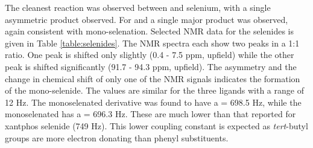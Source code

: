 {%



The cleanest reaction was observed between \tBuxantphos{} and selenium, with a single asymmetric product observed.  For \tButhixantphos{} and \tBusixantphos{} a single major product was observed, again consistent with mono-selenation. Selected NMR data for the selenides is given in Table \ref{table:selenides}.  The \phosphorus{} NMR spectra each show two peaks in a 1:1 ratio.  One peak is shifted only slightly (0.4 - 7.5 ppm, upfield) while the other peak is shifted significantly (91.7 - 94.3 ppm, upfield).  The asymmetry and the change in chemical shift of only one of the \phosphorus{} NMR signals indicates the formation of the mono-selenide.  The \JPSe{} values are similar for the three ligands with a range of 12 Hz.  The monoselenated \tButhixantphos{} derivative was found to have a \JPSe{} = 698.5 Hz, while the monoselenated \tBuxantphos{} has a \JPSe{} = 696.3 Hz.  These are much lower than that reported for xantphos selenide (749 Hz)\cite{Jahromi2012}.  This lower coupling constant is expected as \emph{tert}-butyl groups are more electron donating than phenyl substituents.

}
